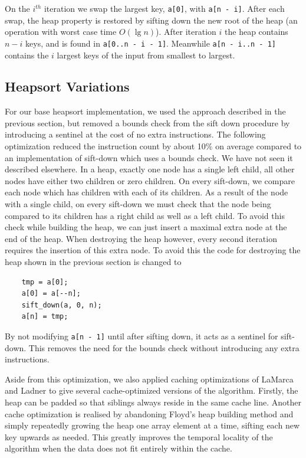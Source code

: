 \documentclass[acmtocl]{acmtrans2m}
\begin{document}
\noindent
On the $i^{th}$ iteration we swap the largest key, 
\texttt{a[0]}, with \texttt{a[n - i]}. 
After each swap, the heap property is restored by sifting down the new root of the heap (an operation with worst case time $O(\lg n)$). 
After iteration $i$ the heap contains $n - i$ keys, and is found in \texttt{a[0..n - i - 1]}. Meanwhile 
\texttt{a[n - i..n - 1]} contains the $i$ largest keys of the input from smallest to largest.

\subsection{Heapsort Variations}

For our base heapsort implementation, we used the approach described in the previous section, but removed a bounds check from the sift down procedure
by introducing a sentinel at the cost of no extra instructions. The following optimization reduced the instruction count by about 10\%
on average compared to an implementation of sift-down which uses a bounds check. We have not seen it described elsewhere. In a heap, exactly one node has a single left child, all 
other nodes have either two children
or zero children. On every sift-down, we compare each node which has children with each of its children. As a result of the node with a single child, on 
every sift-down we
must check that the node being compared to its children has a right child as well as a left child. To avoid this check while building the heap, we can just 
insert
a maximal extra node at the end of the heap. When destroying the heap however, every second iteration requires the insertion of 
this extra node. To avoid this the code for destroying the heap shown in the previous section is changed to

\begin{verbatim}
    tmp = a[0];
    a[0] = a[--n];
    sift_down(a, 0, n);
    a[n] = tmp;
\end{verbatim}

\noindent
By not modifying \texttt{a[n - 1]} until after sifting down,
it acts as a sentinel for sift-down. This removes the need for the bounds check without introducing any extra instructions.

Aside from this optimization, we also applied caching optimizations of LaMarca and Ladner \citeyear{LaMarca96b} to give several cache-optimized versions of the
algorithm. Firstly, the heap can be padded so that siblings
always reside in the same cache line. Another cache optimization is realised by abandoning Floyd's heap building method and simply repeatedly growing the
heap one array element at a time, sifting each new key upwards as needed. This greatly improves the temporal locality of the algorithm when the data
does not fit entirely within the cache. 
\end{document}
